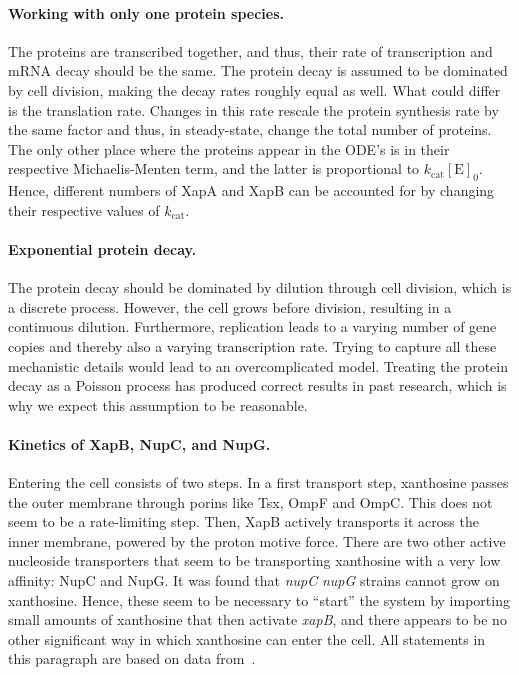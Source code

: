 \documentclass[10pt,letterpaper]{article}
\newcommand{\n}[1]{\mathrm{#1}}
\begin{document}
\paragraph*{Working with only one protein species.}
The proteins are transcribed together, and thus, their rate of transcription and mRNA decay should be the same. The protein decay is assumed to be dominated by cell division, making the decay rates roughly equal as well. What could differ is the translation rate. Changes in this rate rescale the protein synthesis rate by the same factor and thus, in steady-state, change the total number of proteins. The only other place where the proteins appear in the ODE's is in their respective Michaelis-Menten term, and the latter is proportional to $k_{\n{cat}} \n{[E]_0}$. Hence, different numbers of XapA and XapB can be accounted for by changing their respective values of $k_{\n{cat}}$.

\paragraph*{Exponential protein decay.}
The protein decay should be dominated by dilution through cell division, which is a discrete process. However, the cell grows before division, resulting in a continuous dilution. Furthermore, replication leads to a varying number of gene copies and thereby also a varying transcription rate. Trying to capture all these mechanistic details would lead to an overcomplicated model. Treating the protein decay as a Poisson process has produced correct results in past research, which is why we expect this assumption to be reasonable. 

\paragraph*{Kinetics of XapB, NupC, and NupG.}
Entering the cell consists of two steps. In a first transport step, xanthosine passes the
outer membrane through porins like Tsx, OmpF and OmpC. This does not seem to
be a rate-limiting step. Then, XapB actively transports it across the inner
membrane, powered by the proton motive force. There are two other active
nucleoside transporters that seem to be transporting xanthosine with a very
low affinity: NupC and NupG. It was found that \textDelta\emph{nupC}
\textDelta\emph{nupG} strains cannot grow on xanthosine. Hence, these seem
to be necessary to ``start'' the system by importing small amounts of
xanthosine that then activate \emph{xapB}, and there appears to be no other
significant way in which xanthosine can enter the cell. All statements in this paragraph are based on data
from~\cite{Norholm2001}. 
\end{document}
